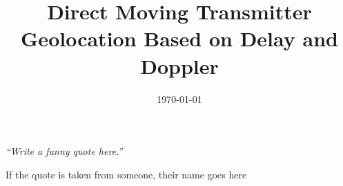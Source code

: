 \documentclass[a4paper, 11pt, oneside]{Thesis}  %
\begin{document}
\frontmatter	  %

\title  {Direct Moving Transmitter Geolocation Based on Delay and Doppler}
\addresses  {\groupname\\\deptname\\\univname}  %
\date       {\today}
\subject    {}
\keywords   {}

\maketitle



\fancyhead{}  %
\rhead{\thepage}  %
\lhead{}  %

\pagestyle{fancy}  %



\pagestyle{empty}  %

\null\vfill
\textit{``Write a funny quote here.''}

\begin{flushright}
If the quote is taken from someone, their name goes here
\end{flushright}

\vfill\vfill\vfill\vfill\vfill\vfill\null
\clearpage  %
\end{document}
